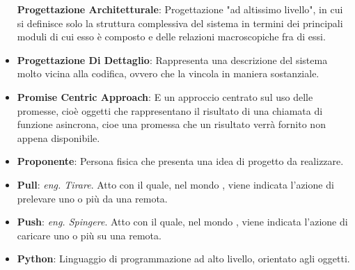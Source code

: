\begin{itemize}
	\textbf{Progettazione Architetturale}: Progettazione "ad altissimo livello", in cui si definisce solo la struttura complessiva del sistema in termini dei principali moduli di cui esso è composto e delle relazioni macroscopiche fra di essi.
	\item
	\textbf{Progettazione Di Dettaglio}: Rappresenta una descrizione del sistema molto vicina alla codifica, ovvero che la vincola in maniera sostanziale.
	\item
	\textbf{Promise Centric Approach}: E un approccio centrato sul uso delle promesse, cioè oggetti che rappresentano il risultato di una chiamata di funzione asincrona, cioe una promessa che un risultato verrà fornito non appena disponibile.
	\item
	\textbf{Proponente}: Persona fisica che presenta una idea di progetto da realizzare.
	\item
	\textbf{Pull}: \textit{eng. Tirare}. Atto con il quale, nel mondo , viene indicata l'azione di prelevare uno o più  da una  remota.
	\item
	\textbf{Push}: \textit{eng. Spingere}. Atto con il quale, nel mondo , viene indicata l'azione di caricare uno o più  su una  remota.
	\item
	\textbf{Python}: Linguaggio di programmazione ad alto livello, orientato agli oggetti.
\end{itemize}
\newpage